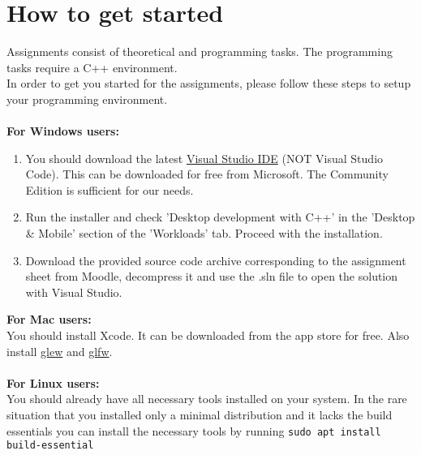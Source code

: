\documentclass[12pt, a4paper, oneside, ngerman]{article}
\begin{document}



\section{How to get started}

Assignments consist of theoretical and programming tasks. The programming tasks require a C++ environment.\\

In order to get you started for the assignments, please follow these steps to setup your programming environment. \\
\\
\textbf{For Windows users:}

\begin{enumerate}
\item You should download the latest \href{https://visualstudio.microsoft.com}{Visual Studio IDE} (NOT Visual Studio Code). This can be downloaded for free from Microsoft. The Community Edition is sufficient for our needs.

\item Run the installer and check 'Desktop development with C++' in the 'Desktop \& Mobile' section of the 'Workloads' tab. Proceed with the installation.

\item Download the provided source code archive corresponding to the assignment sheet from Moodle, decompress it and use the .sln file to open the solution with Visual Studio.\\

\end{enumerate}
\textbf{For Mac users:}\\

You should install Xcode. It can be downloaded from the app store for free. Also install \href{http://glew.sourceforge.net/}{glew} and \href{https://www.glfw.org/}{glfw}.\\
\\
\textbf{For Linux users:}\\

You should already have all necessary tools installed on your system. In the rare situation that you installed only a minimal distribution and it lacks the build essentials you can install the necessary tools by running \texttt{sudo apt install build-essential}
\end{document}
